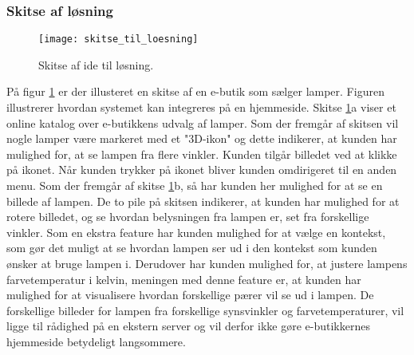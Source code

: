 \subsubsection{Skitse af løsning}

\label{sec:skitse_loesning}

\begin{figure}[H]
   \centering
   \texttt{[image: skitse\_til\_loesning]}
   \caption{Skitse af ide til løsning.}
   \label{fig:skitse_af_ide}
\end{figure}

På figur \ref{fig:skitse_af_ide} er der illusteret en skitse af en e-butik som sælger lamper. Figuren illustrerer hvordan systemet kan integreres på en hjemmeside. Skitse \ref{fig:skitse_af_ide}a viser et online katalog over e-butikkens udvalg af lamper. Som der fremgår af skitsen vil nogle lamper være markeret med et "3D-ikon" og dette indikerer, at kunden har mulighed for, at se lampen fra flere vinkler. Kunden tilgår billedet ved at klikke på ikonet. Når kunden trykker på ikonet bliver kunden omdirigeret til en anden menu. Som der fremgår af skitse \ref{fig:skitse_af_ide}b, så har kunden her mulighed for at se en billede af lampen. De to pile på skitsen indikerer, at kunden har mulighed for at rotere billedet, og se hvordan belysningen fra lampen er, set fra forskellige vinkler. Som en ekstra feature har kunden mulighed for at vælge en kontekst, som gør det muligt at se hvordan lampen ser ud i den kontekst som kunden ønsker at bruge lampen i. 
Derudover har kunden mulighed for, at justere lampens farvetemperatur i kelvin, meningen med denne feature er, at kunden har mulighed for at visualisere hvordan forskellige pærer vil se ud i lampen. De forskellige billeder for lampen fra forskellige synsvinkler og farvetemperaturer, vil ligge til rådighed på en ekstern server og vil derfor ikke gøre e-butikkernes hjemmeside betydeligt langsommere. 

